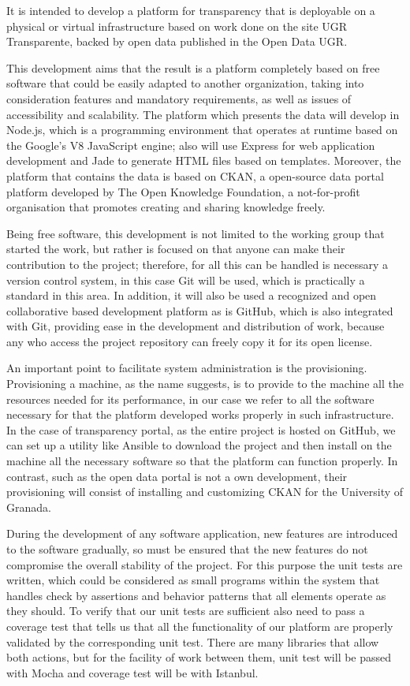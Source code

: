 {It is intended to develop a platform for transparency that is deployable on a physical or virtual infrastructure based on work
done on the site UGR Transparente, backed by open data published in the Open Data UGR.

\bigskip
This development aims that the result is a platform completely based on free software that could be easily adapted to another
organization, taking into consideration features and mandatory requirements, as well as issues of accessibility and scalability.
The platform which presents the data will develop in Node.js, which is a programming environment that operates at runtime based
on the Google's V8 JavaScript engine; also will use Express for web application development and Jade to generate HTML files
based on templates. Moreover, the platform that contains the data is based on CKAN, a open-source data portal platform
developed by The Open Knowledge Foundation, a not-for-profit organisation that promotes creating and sharing knowledge freely.

\bigskip
Being free software, this development is not limited to the working group that started the work, but rather is focused on that
anyone can make their contribution to the project; therefore, for all this can be handled is necessary a version control system,
in this case Git will be used, which is practically a standard in this area. In addition, it will also be used a recognized and
open collaborative based development platform as is GitHub, which is also integrated with Git, providing ease in the 
development and distribution of work, because any who access the project repository can freely copy it for its open license.

\bigskip
An important point to facilitate system administration is the provisioning. Provisioning a machine, as the name suggests, is to
provide to the machine all the resources needed for its performance, in our case we refer to all the software necessary for
that the platform developed works properly in such infrastructure. In the case of transparency portal, as the entire project
is hosted on GitHub, we can set up a utility like Ansible to download the project and then install on the machine all the
necessary software so that the platform can function properly. In contrast, such as the open data portal is not a own
development, their provisioning will consist of installing and customizing CKAN for the University of Granada.

\bigskip
During the development of any software application, new features are introduced to the software gradually, so must be ensured
that the new features do not compromise the overall stability of the project. For this purpose the unit tests are written, 
which could be considered as small programs within the system that handles check by assertions and behavior patterns that all
elements operate as they should. To verify that our unit tests are sufficient also need to pass a coverage test that tells us
that all the functionality of our platform are properly validated by the corresponding unit test. There are many libraries that
allow both actions, but for the facility of work between them, unit test will be passed with Mocha and coverage test will be
with Istanbul.

}
